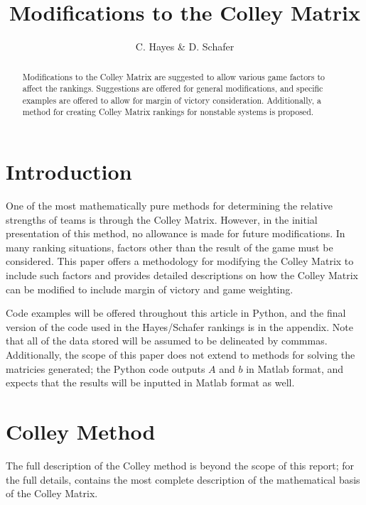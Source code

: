 \documentclass[12pt, letterpaper]{article}
\title{Modifications to the Colley Matrix}
\author{C. Hayes \& D. Schafer}
\begin{document}
\maketitle

\begin{abstract}

Modifications to the Colley Matrix are suggested to allow various game factors to affect the rankings.  Suggestions are offered for general modifications, and specific examples are offered to allow for margin of victory consideration.  Additionally, a method for creating Colley Matrix rankings for nonstable systems is proposed.

\end{abstract}

\newpage

\section{Introduction}

\par One of the most mathematically pure methods for determining the relative strengths of teams is through the Colley Matrix.  However, in the initial presentation of this method, no allowance is made for future modifications.  In many ranking situations, factors other than the result of the game must be considered.  This paper offers a methodology for modifying the Colley Matrix to include such factors and provides detailed descriptions on how the Colley Matrix can be modified to include margin of victory and game weighting.

\par Code examples will be offered throughout this article in Python, and the final version of the code used in the Hayes/Schafer rankings is in the appendix.  Note that all of the data stored will be assumed to be delineated by commmas.  Additionally, the scope of this paper does not extend to methods for solving the matricies generated; the Python code outputs $A$ and $b$ in Matlab format, and expects that the results will be inputted in Matlab format as well.

\section{Colley Method}

\par The full description of the Colley method is beyond the scope of this report; for the full details, \cite{colley02} contains the most complete description of the mathematical basis of the Colley Matrix.
\end{document}
